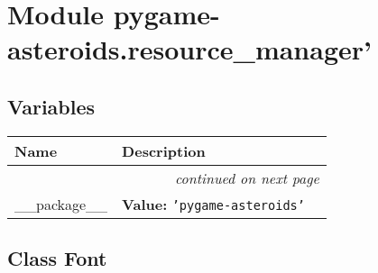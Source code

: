 %
%
%


\section{Module pygame-asteroids.resource\_manager'}

    \label{pygame-asteroids:resource_manager'}


  \subsection{Variables}

    \vspace{-1cm}
\hspace{\varindent}\begin{longtable}{|p{\varnamewidth}|p{\vardescrwidth}|l}
\cline{1-2}
\cline{1-2} \centering \textbf{Name} & \centering \textbf{Description}& \\
\cline{1-2}
\endhead\cline{1-2}\multicolumn{3}{r}{\small\textit{continued on next page}}\\\endfoot\cline{1-2}
\endlastfoot\raggedright \_\-\_\-p\-a\-c\-k\-a\-g\-e\-\_\-\_\- & \raggedright \textbf{Value:} 
{\tt \texttt{'}\texttt{pygame-asteroids}\texttt{'}}&\\
\cline{1-2}
\end{longtable}



\subsection{Class Font}

